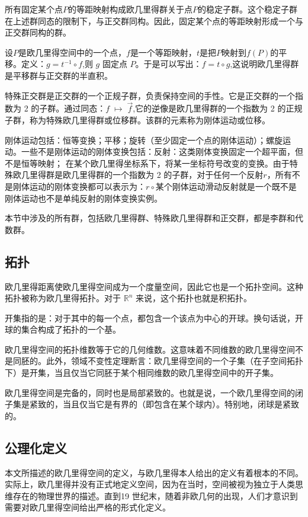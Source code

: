 所有固定某个点$P$的等距映射构成欧几里得群关于点$P$的稳定子群。这个稳定子群在上述群同态的限制下，与正交群同构。因此，固定某个点的等距映射形成一个与正交群同构的群。

设$P$是欧几里得空间中的一个点，$f$是一个等距映射，$t$是把$P$映射到$f(P)$的平移。定义：$g = t^{-1} \circ f$,则 $g$ 固定点 $P$。于是可以写出：$
f = t \circ g$,这说明欧几里得群是平移群与正交群的半直积。

特殊正交群是正交群的一个正规子群，负责保持空间的手性。它是正交群的一个指数为 2 的子群。通过同态：$f \;\mapsto\; \overrightarrow{f}$,它的逆像是欧几里得群的一个指数为 2 的正规子群，称为特殊欧几里得群或位移群。该群的元素称为刚体运动或位移。

刚体运动包括：恒等变换；平移；旋转（至少固定一个点的刚体运动）；螺旋运动。一些不是刚体运动的刚体变换包括：反射：这类刚体变换固定一个超平面，但不是恒等映射；
在某个欧几里得坐标系下，将某一坐标符号改变的变换。由于特殊欧几里得群是欧几里得群的一个指数为 2 的子群，对于任何一个反射$r$，所有不是刚体运动的刚体变换都可以表示为：$r \circ$某个刚体运动滑动反射就是一个既不是刚体运动也不是单纯反射的刚体变换实例。

本节中涉及的所有群，包括欧几里得群、特殊欧几里得群和正交群，都是李群和代数群。
\subsection{拓扑}
欧几里得距离使欧几里得空间成为一个度量空间，因此它也是一个拓扑空间。这种拓扑被称为欧几里得拓扑。对于 $\mathbb{R}^n$ 来说，这个拓扑也就是积拓扑。

开集指的是：对于其中的每一个点，都包含一个该点为中心的开球。换句话说，开球的集合构成了拓扑的一个基。

欧几里得空间的拓扑维数等于它的几何维数。这意味着不同维数的欧几里得空间不是同胚的。此外，领域不变性定理断言：欧几里得空间的一个子集（在子空间拓扑下）是开集，当且仅当它同胚于某个相同维数的欧几里得空间中的开子集。

欧几里得空间是完备的，同时也是局部紧致的。也就是说，一个欧几里得空间的闭子集是紧致的，当且仅当它是有界的（即包含在某个球内）。特别地，闭球是紧致的。
\subsection{公理化定义}
本文所描述的欧几里得空间的定义，与欧几里得本人给出的定义有着根本的不同。实际上，欧几里得并没有正式地定义空间，因为在当时，空间被视为独立于人类思维存在的物理世界的描述。直到19 世纪末，随着非欧几何的出现，人们才意识到需要对欧几里得空间给出严格的形式化定义。

